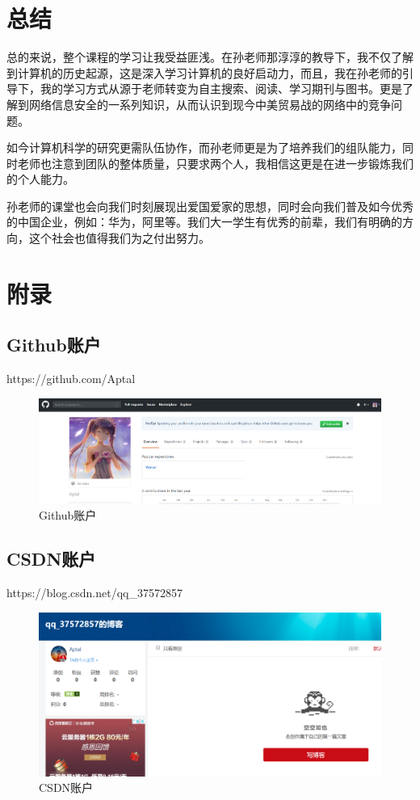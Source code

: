 \documentclass{article}
\begin{document}
\section{总结}
总的来说，整个课程的学习让我受益匪浅。在孙老师那淳淳的教导下，我不仅了解到计算机的历史起源，这是深入学习计算机的良好启动力，而且，我在孙老师的引导下，我的学习方式从源于老师转变为自主搜索、阅读、学习期刊与图书。更是了解到网络信息安全的一系列知识，从而认识到现今中美贸易战的网络中的竞争问题。\par
如今计算机科学的研究更需队伍协作，而孙老师更是为了培养我们的组队能力，同时老师也注意到团队的整体质量，只要求两个人，我相信这更是在进一步锻炼我们的个人能力。\par
孙老师的课堂也会向我们时刻展现出爱国爱家的思想，同时会向我们普及如今优秀的中国企业，例如：华为，阿里等。我们大一学生有优秀的前辈，我们有明确的方向，这个社会也值得我们为之付出努力。\par

\section{附录}
\subsection{Github账户}
https://github.com/Aptal \par
\begin{figure}[h!]
	\centering
    \includegraphics[scale=0.2]{Github}
    \caption{Github账户}
    \label{fig:Github}
\end{figure}

\subsection{CSDN账户}
https://blog.csdn.net/qq\_37572857\par
\begin{figure}[h!]
	\centering
	\includegraphics[scale=0.30]{CSDN}
	\caption{CSDN账户}
	\label{fig:CSDN}
\end{figure}
\end{document}
